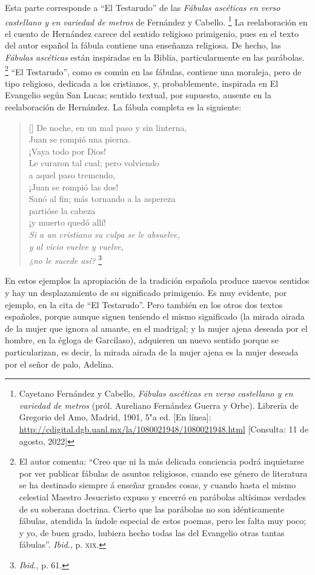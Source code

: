 \documentclass[14pt,twoside,final]{extbook} %
\let\oldfootnote\footnote
\renewcommand\footnote[1]{%
\oldfootnote{\hspace{1mm}#1}}
\begin{document}
Esta parte corresponde a ``El Testarudo'' de las \emph{Fábulas ascéticas en verso castellano y en variedad de metros} de Fernández y Cabello.\footnote{Cayetano Fernández y Cabello, \emph{Fábulas ascéticas en verso castellano y en variedad de metros} (pról. Aureliano Fernández Guerra y Orbe). Librería de Gregorio del Amo, Madrid, 1901, 5"a ed. [En línea]: \url{http://cdigital.dgb.uanl.mx/la/1080021948/1080021948.html} [Consulta: 11 de agosto, 2022]} La reelaboración en el cuento de Hernández carece del sentido religioso primigenio, pues en el texto del autor español la fábula contiene una enseñanza religiosa. De hecho, las \emph{Fábulas ascéticas} están inspiradas en la Biblia, particularmente en las parábolas.\footnote{El autor comenta: ``Creo que ni la más delicada conciencia podrá inquietarse por ver publicar fábulas de asuntos religiosos, cuando ese género de literatura se ha destinado siempre á enseñar grandes cosas, y cuando hasta el mismo celestial Maestro Jesucristo expuso y encerró en parábolas altísimas verdades de su soberana doctrina. Cierto que las parábolas no son idénticamente fábulas, atendida la índole especial de estos poemas, pero les falta muy poco; y yo, de buen grado, hubiera hecho todas las del Evangelio otras tantas fábulas''. \emph{Ibid.}, p. \textsc{xix}.} ``El Testarudo'', como es común en las fábulas, contiene una moraleja, pero de tipo religioso, dedicada a los cristianos, y, probablemente, inspirada en El Evangelio según San Lucas; sentido textual, por supuesto, ausente en la reelaboración de Hernández. La fábula completa es la siguiente:
\settowidth{\versewidth}{De noche, en un mal paso y sin linterna,}
\begin{verse}[\versewidth]
De noche, en un mal paso y sin linterna, \\
Juan se rompió una pierna. \\
¡Vaya todo por Dios! \\
Le curaron tal cual; pero volviendo \\
a aquel paso tremendo, \\
¡Juan se rompió las dos! \\
Sanó al fin; más tornando a la aspereza \\
partióse la cabeza \\
¡y muerto quedó allí! \\
\emph{Si a un cristiano su culpa se le absuelve, \\
y al vicio vuelve y vuelve, \\
¿no le sucede así?}\footnote{\emph{Ibid.}, p. 61.}
\end{verse}
En estos ejemplos la apropiación de la tradición española produce nuevos sentidos y hay un desplazamiento de su significado primigenio. Es muy evidente, por ejemplo, en la cita de ``El Testarudo''. Pero también en los otros dos textos españoles, porque aunque siguen teniendo el mismo significado (la mirada airada de la mujer que ignora al amante, en el madrigal; y la mujer ajena deseada por el hombre, en la égloga de Garcilaso), adquieren un nuevo sentido porque se particularizan, es decir, la mirada airada de la mujer ajena es la mujer deseada por el señor de palo, Adelina.
\end{document}
